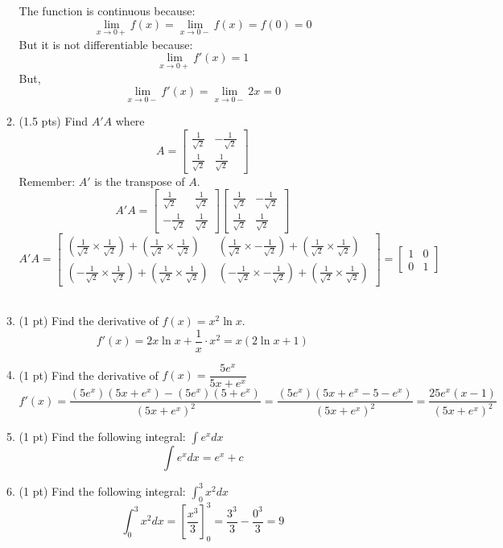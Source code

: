 \documentclass{./../../../Latex/tests}
\begin{document}
\begin{enumerate}
\begin{enumerate}
   The function is continuous because:
$$\lim_{x \rightarrow 0+} f(x) = \lim_{x \rightarrow 0-} f(x) = f(0) = 0 $$
But it is not differentiable because:
$$ \lim_{x \rightarrow 0+} f'(x) = 1 $$
But,
$$\lim_{x \rightarrow 0-} f'(x) = \lim_{x \rightarrow 0-} 2x = 0$$
\newpage
\item (1.5 pts) Find $A'A$ where $$ A=\begin{bmatrix}
	\frac{1}{\sqrt{2}} & -\frac{1}{\sqrt{2}} \\ \frac{1}{\sqrt{2}} & \frac{1}{\sqrt{2}}
\end{bmatrix} $$
Remember: $A'$ is the transpose of $A$.
\[
A'A = \begin{bmatrix}
\frac{1}{\sqrt{2}} & \frac{1}{\sqrt{2}} \\
-\frac{1}{\sqrt{2}} & \frac{1}{\sqrt{2}}
\end{bmatrix}
\begin{bmatrix}
\frac{1}{\sqrt{2}} & -\frac{1}{\sqrt{2}} \\
\frac{1}{\sqrt{2}} & \frac{1}{\sqrt{2}}
\end{bmatrix}
\]
\[
A'A = \begin{bmatrix}
\left( \frac{1}{\sqrt{2}} \times \frac{1}{\sqrt{2}} \right) + \left( \frac{1}{\sqrt{2}} \times \frac{1}{\sqrt{2}} \right) & \left( \frac{1}{\sqrt{2}} \times -\frac{1}{\sqrt{2}} \right) + \left( \frac{1}{\sqrt{2}} \times \frac{1}{\sqrt{2}} \right) \\
\left( -\frac{1}{\sqrt{2}} \times \frac{1}{\sqrt{2}} \right) + \left( \frac{1}{\sqrt{2}} \times \frac{1}{\sqrt{2}} \right) & \left( -\frac{1}{\sqrt{2}} \times -\frac{1}{\sqrt{2}} \right) + \left( \frac{1}{\sqrt{2}} \times \frac{1}{\sqrt{2}} \right)
\end{bmatrix} = \begin{bmatrix}
1 & 0 \\
0 & 1
\end{bmatrix}
\] \\

\item (1 pt) Find the derivative of $ f(x) = x^2 \ln x $.
$$ f'(x) = 2x \ln x + \frac{1}{x}\cdot x^2 = x(2 \ln x + 1) $$  \vspace{0.25em}
\item (1 pt) Find the derivative of $f(x) = \dfrac{5e^x}{5x+e^x}$
  \[
f'(x) = \frac{(5e^x)(5x + e^x) - (5e^x)(5 + e^x)}{(5x + e^x)^2} = \frac{(5e^x)(5x + e^x - 5 - e^x)}{(5x + e^x)^2} = \frac{25e^x(x - 1)}{(5x + e^x)^2}
\] \vspace{0.25em}
 \item (1 pt) Find the following integral: $ \int e^x dx $
    $$ \int e^x dx =  e^x + c $$
\item (1 pt) Find the following integral: $ \int_0^3 x^2 dx $
$$ \int_0^3 x^2 dx = \left[\frac{x^3}{3}\right]_{0}^3 = \frac{3^3}{3}-\frac{0^3}{3} = 9 $$
\end{enumerate}


\end{enumerate}
\end{document}
